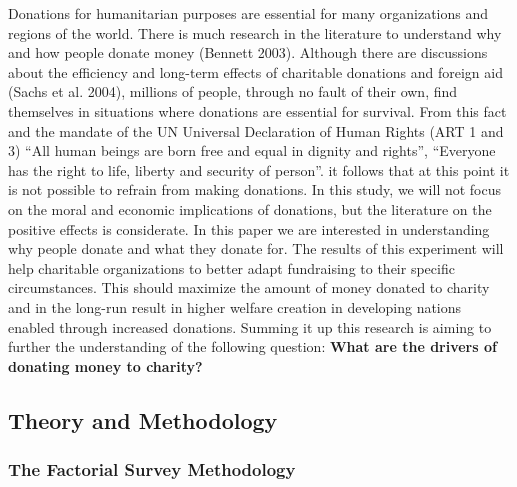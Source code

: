 \documentclass[
  12pt,
]{article}
\begin{document}
Donations for humanitarian purposes are essential for many organizations
and regions of the world. There is much research in the literature to
understand why and how people donate money (Bennett 2003). Although
there are discussions about the efficiency and long-term effects of
charitable donations and foreign aid (Sachs et al. 2004), millions of
people, through no fault of their own, find themselves in situations
where donations are essential for survival. From this fact and the
mandate of the UN Universal Declaration of Human Rights (ART 1 and 3)
``All human beings are born free and equal in dignity and rights'',
``Everyone has the right to life, liberty and security of person''. it
follows that at this point it is not possible to refrain from making
donations. In this study, we will not focus on the moral and economic
implications of donations, but the literature on the positive effects is
considerate. In this paper we are interested in understanding why people
donate and what they donate for. The results of this experiment will
help charitable organizations to better adapt fundraising to their
specific circumstances. This should maximize the amount of money donated
to charity and in the long-run result in higher welfare creation in
developing nations enabled through increased donations. Summing it up
this research is aiming to further the understanding of the following
question: \textbf{What are the drivers of donating money to charity?}

\hypertarget{theory-and-methodology}{%
\subsection{Theory and Methodology}\label{theory-and-methodology}}

\hypertarget{the-factorial-survey-methodology}{%
\subsubsection{The Factorial Survey
Methodology}\label{the-factorial-survey-methodology}}
\end{document}
